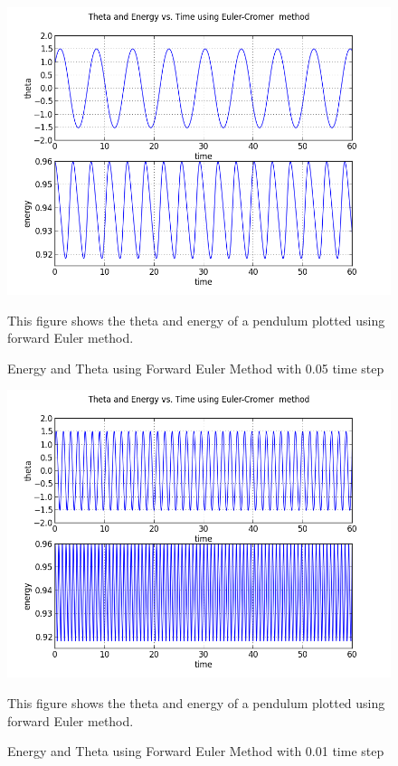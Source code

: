 \documentclass[letterpaper,12pt]{article}
\begin{document}
\FloatBarrier
\begin{figure}[h!]
\centering
\includegraphics[scale=0.7]{2_b_05.png}
\caption{Energy and Theta using Forward Euler Method with 0.05 time step}
This figure shows the theta and energy of a pendulum plotted using forward Euler method.
\end{figure}
\FloatBarrier


\FloatBarrier
\begin{figure}[h!]
\centering
\includegraphics[scale=0.7]{2_b_01.png}
\caption{Energy and Theta using Forward Euler Method with 0.01 time step}
This figure shows the theta and energy of a pendulum plotted using forward Euler method.
\end{figure}
\FloatBarrier
\end{document}
